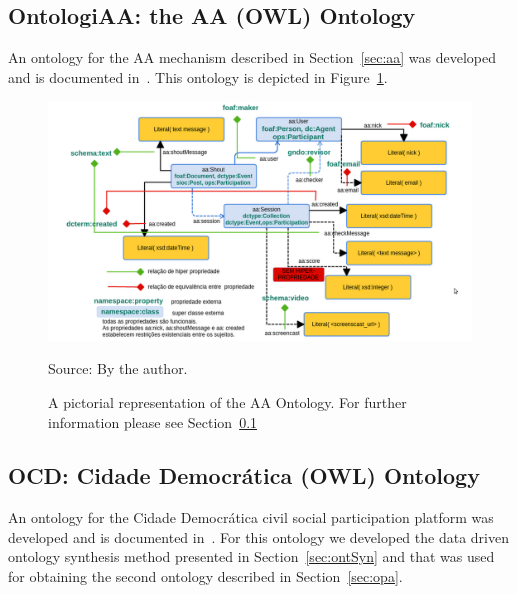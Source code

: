 \begin{apendicesenv}
\subsection{OntologiAA: the AA (OWL) Ontology}\label{sec:ontologiaa}
An ontology for the AA mechanism described in Section~\ref{sec:aa} was developed and is documented in~\cite{opa}.
This ontology is depicted in Figure~\ref{fig:aaOn}.
\begin{figure}[h!]
\begin{center}
\includegraphics[scale=.3]{figs/ontologiaa}
\caption{A pictorial representation of the AA Ontology.
	For further information please see Section~\ref{sec:ontologiaa}}
\label{fig:aaOn}
\begin{flushleft}\footnotesize
Source: By the author.\
\end{flushleft}
\end{center}
\end{figure}
\subsection{OCD: Cidade Democrática (OWL) Ontology}
An ontology for the Cidade Democrática civil social participation platform was developed and is documented in~\cite{opa}.
For this ontology we developed the data driven ontology synthesis method presented in Section~\ref{sec:ontSyn}
and that was used for obtaining the second ontology described in Section~\ref{sec:opa}.


\end{apendicesenv}
